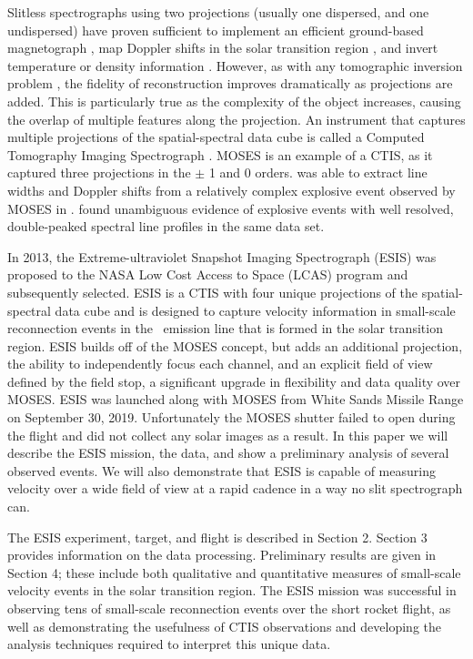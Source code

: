     Slitless spectrographs using two projections (usually one dispersed, and one undispersed) have proven sufficient to implement an efficient ground-based magnetograph \citep{DeforestStereoscopy2004}, map Doppler shifts in the solar transition region \citep{Courrier2018}, and invert temperature or density information \citep{winebarger2019}. 
    However, as with any tomographic inversion problem \citep[e.g.,][]{KakSlaney2001}, the fidelity of reconstruction improves dramatically as projections are added. 
    This is particularly true as the complexity of the object increases, causing the overlap of multiple features along the projection. 
    An instrument that captures multiple projections of the spatial-spectral data cube is called a Computed Tomography Imaging Spectrograph  \cite[CTIS,][]{DescourDereniakCTIS1995}.  
    MOSES is an example of a CTIS, as it captured three projections in the $\pm$ 1 and 0 orders.  
    \cite{Fox2010} was able to extract line widths and Doppler shifts from a relatively complex explosive event observed by MOSES in \heii.  
    \cite{Rust2019} found unambiguous evidence of explosive events with well resolved, double-peaked spectral line profiles in the same data set.
    
    In 2013, the Extreme-ultraviolet Snapshot Imaging Spectrograph (ESIS) was proposed to the NASA Low Cost Access to Space (LCAS) program and subsequently selected.  
    ESIS is a CTIS with four unique projections of the spatial-spectral data cube and is designed to capture velocity information in small-scale reconnection events in the \ov \ emission line that is formed in the solar transition region. 
    ESIS builds off of the MOSES concept, but adds an additional projection, the ability to independently focus each channel, and an explicit field of view defined by the field stop, a significant upgrade in flexibility and data quality over MOSES.
    ESIS was launched along with MOSES from White Sands Missile Range on September 30,  2019.
    Unfortunately the MOSES shutter failed to open during the flight and did not collect any solar images as a result.
    In this paper we will describe the ESIS mission, the data, and show a preliminary analysis of several observed events.
    We will also demonstrate that ESIS is capable of measuring velocity over a wide field of view at a rapid cadence in a way no slit spectrograph can.
    
    The ESIS experiment, target, and flight is described in Section 2.  
    Section 3 provides information on the data processing.  
    Preliminary results are given in Section 4; these include both qualitative and quantitative measures of small-scale velocity events in the solar transition region.  
    The ESIS mission was successful in  observing tens of small-scale reconnection events over the short rocket flight, as well as demonstrating the usefulness of CTIS observations and developing the analysis techniques required to interpret this unique data.


